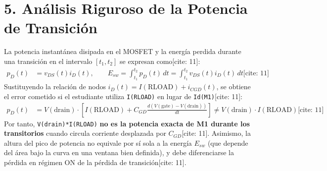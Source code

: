 \documentclass[11pt, a4paper]{article}
\begin{document}
\section*{5. Análisis Riguroso de la Potencia de Transición}
La potencia instantánea disipada en el MOSFET y la energía perdida durante una transición en el intervalo $[t_1, t_2]$ se expresan como[cite: 11]:
\begin{align}
    p_D(t) &= v_{DS}(t) i_D(t), \qquad E_{sw} = \int_{t_1}^{t_2} p_D(t)\,dt = \int_{t_1}^{t_2} v_{DS}(t) i_D(t)\,dt \text{[cite: 11]}
\end{align}
Sustituyendo la relación de nodos $i_D(t) = I(\text{RLOAD}) + i_{CGD}(t)$, se obtiene el error cometido si el estudiante utiliza \texttt{I(RLOAD)} en lugar de \texttt{Id(M1)}[cite: 11]:
\begin{align}
    p_D(t) &= V(\text{drain}) \cdot \left[ I(\text{RLOAD}) + C_{GD}\frac{d\left(V(\text{gate}) - V(\text{drain})\right)}{dt} \right] \neq V(\text{drain}) \cdot I(\text{RLOAD}) \text{[cite: 11]}
\end{align}
Por tanto, \texttt{V(drain)*I(RLOAD)} \textbf{no es la potencia exacta de M1 durante los transitorios} cuando circula corriente desplazada por $C_{GD}$[cite: 11]. Asimismo, la altura del pico de potencia no equivale por sí sola a la energía $E_{sw}$ (que depende del área bajo la curva en una ventana bien definida), y debe diferenciarse la pérdida en régimen ON de la pérdida de transición[cite: 11].

\begin{center}
\end{center}
\end{document}
